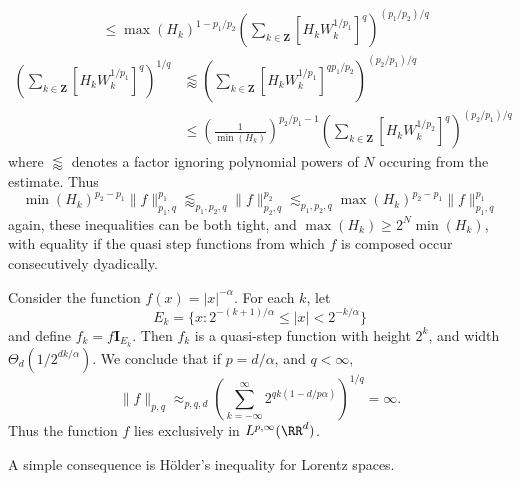 \begin{remark}
\begin{align*}
        &\leq \max(H_k)^{1 - p_1/p_2} \left( \sum_{k \in \mathbf{Z}} \left[ H_k W_k^{1/p_1} \right]^q \right)^{(p_1/p_2)/q}
    \end{align*}
    \begin{align*}
        \left( \sum_{k \in \mathbf{Z}} \left[ H_k W_k^{1/p_1} \right]^q \right)^{1/q} &\lessapprox \left( \sum_{k \in \mathbf{Z}} \left[ H_k W_k^{1/p_1} \right]^{qp_1/p_2} \right)^{(p_2/p_1)/q}\\
        &\leq \left( \frac{1}{\min(H_k)} \right)^{p_2/p_1 - 1} \left( \sum_{k \in \mathbf{Z}} \left[ H_k W_k^{1/p_2} \right]^q \right)^{(p_2/p_1)/q}
    \end{align*}
    where $\lessapprox$ denotes a factor ignoring polynomial powers of $N$ occuring from the estimate. Thus
    \[ \min(H_k)^{p_2 - p_1} \| f \|_{p_1,q}^{p_1} \lessapprox_{p_1,p_2,q} \| f \|_{p_2,q}^{p_2} \lesssim_{p_1,p_2,q} \max(H_k)^{p_2-p_1} \| f \|_{p_1,q}^{p_1} \]
    again, these inequalities can be both tight, and $\max(H_k) \geq 2^N \min(H_k)$, with equality if the quasi step functions from which $f$ is composed occur consecutively dyadically.
\end{remark}

\begin{example}
    Consider the function $f(x) = |x|^{-\alpha}$. For each $k$, let
    \[ E_k = \{ x : 2^{-(k+1)/\alpha} \leq |x| < 2^{-k/\alpha} \} \]
    and define $f_k = f \mathbf{I}_{E_k}$. Then $f_k$ is a quasi-step function with height $2^k$, and width $\Theta_d(1/2^{dk/\alpha})$. We conclude that if $p = d/\alpha$, and $q < \infty$,
    \[ \| f \|_{p,q} \approx_{p,q,d} \left( \sum_{k = -\infty}^\infty 2^{qk(1 - d/p\alpha)} \right)^{1/q} = \infty. \]
    Thus the function $f$ lies exclusively in $L^{p,\infty}(\RR^d)$.
\end{example}

A simple consequence is H\"{o}lder's inequality for Lorentz spaces.

